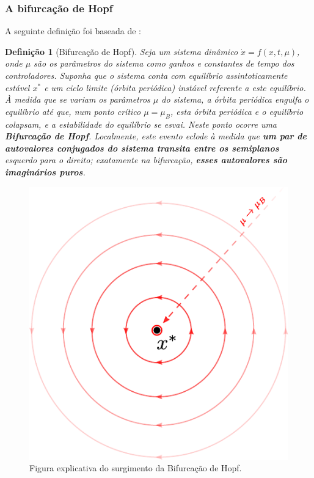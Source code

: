 \documentclass[10pt, compress,xcolor={svgnames,dvipsnames,x11names}]{beamer}
\begin{document}
\begin{frame}%
\frametitle{A bifurcação de Hopf}
\scriptsize
\newtheorem{definit}{Definição} %
	A seguinte definição foi baseada de \cite{livroNonlinearChaos,livroTowardAnalyticalChaos,phdHopf}:

\begin{definit}[Bifurcação de Hopf] 	
	Seja um sistema dinâmico $\dot{x} = f\left( x,t,\mu \right)$, onde $\mu$ são os parâmetros do sistema como ganhos e constantes de tempo dos controladores. Suponha que o sistema conta com equilíbrio assintoticamente estável $x^*$ e um ciclo limite (órbita periódica) instável referente a este equilíbrio. À medida que se variam os parâmetros $\mu$ do sistema, a órbita periódica engulfa o equilíbrio até que, num ponto crítico $\mu = \mu_B$, esta órbita periódica e o equilíbrio colapsam, e a estabilidade do equilíbrio se esvai. Neste ponto ocorre uma \textbf{Bifurcação de Hopf}. Localmente, este evento eclode à medida que \textbf{um par de autovalores conjugados do sistema transita entre os semiplanos} esquerdo para o direito; exatamente na bifurcação, \textbf{esses autovalores são imaginários puros}.
\end{definit}

\begin{figure}[htb]
	\begin{center}
	    \includegraphics[width = 0.3\columnwidth]{../images/presentation/colapso.pdf}
	\end{center}
	\caption{\label{fig:colapso} Figura explicativa do surgimento da Bifurcação de Hopf.}
\end{figure}

\normalsize
\end{frame}%
\end{document}
